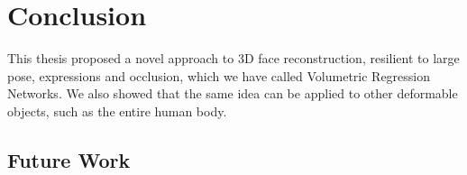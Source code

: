 \chapter{Conclusion}

This thesis proposed a novel approach to 3D face reconstruction,
resilient to large pose, expressions and occlusion, which we have
called Volumetric Regression Networks. We also showed that the same
idea can be applied to other deformable objects, such as the entire
human body. 

\section{Future Work}






